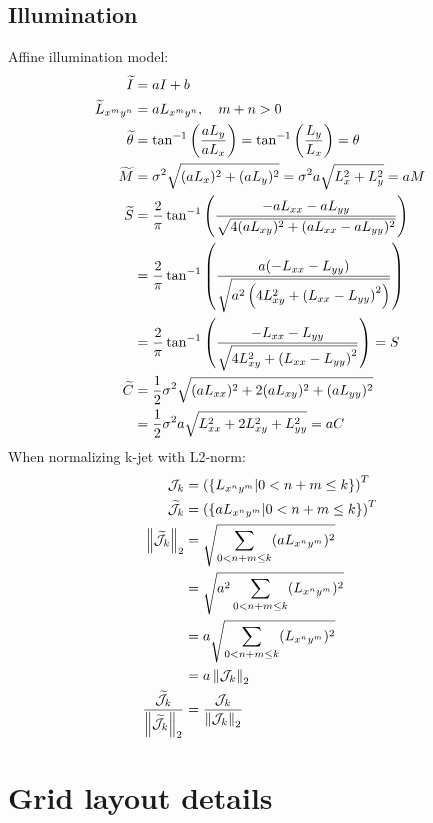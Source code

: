 \documentclass[thesis.tex]{subfiles}
\begin{document}
\section{Illumination} \label{apx:illumination}
%
Affine illumination model:
%
\begin{align}
  \widetilde{I} &= a I  + b \\
  \widetilde{L}_{x^m y^n} &= a L_{x^m y^n}, \quad m+n > 0 \\
  \widetilde{\theta} &= \tan^{-1} \left( \frac{a L_y}{a L_x} \right) = \tan^{-1} \left( \frac{L_y}{L_x} \right) = \theta \\
  \widetilde{M} &= \sigma^2 \sqrt{(a L_x)^2 + (a L_y)^2} = \sigma^2 a \sqrt{L_x^2 + L_y^2} = a M \\
  \widetilde{S} &= \frac{2}{\pi} \tan^{-1} \left( \frac{-a L_{xx} - a L_{yy}}{\sqrt{4(aL_{xy})^2 + (aL_{xx} - aL_{yy})^2}} \right) \\
  &= \frac{2}{\pi} \tan^{-1} \left( \frac{a (-L_{xx} - L_{yy})}{\sqrt{a^2 \left(4L_{xy}^2 + \left(L_{xx} - L_{yy} \right)^2 \right)}} \right) \\
  &= \frac{2}{\pi} \tan^{-1} \left( \frac{-L_{xx} - L_{yy}}{\sqrt{4L_{xy}^2 + \left(L_{xx} - L_{yy} \right)^2}} \right) = S \\
  \widetilde{C} &= \frac12 \sigma^2 \sqrt{(a L_{xx})^2 + 2 (a L_{xy})^2 + (a L_{yy})^2} \\
  &= \frac12 \sigma^2 a \sqrt{L_{xx}^2 + 2 L_{xy}^2 + L_{yy}^2} = a C
\end{align}
%
When normalizing k-jet with L2-norm:
%
\begin{align}
  \mathcal{J}_k &= \left( \left \lbrace L_{x^n y^m} | 0 < n+m \leq k \right \rbrace \right)^T \\
  \widetilde{\mathcal{J}}_k &=\left( \left \lbrace a L_{x^n y^m} | 0 < n+m \leq k \right \rbrace \right)^T \\
  \left \| \widetilde{\mathcal{J}}_k \right \|_2 &= \sqrt{\sum_{0 < n+m \leq k} (a L_{x^n y^m})^2} \\
      &= \sqrt{a^2\sum_{0 < n+m \leq k} (L_{x^n y^m})^2} \\
      &= a\sqrt{\sum_{0 < n+m \leq k} (L_{x^n y^m})^2} \\
      &= a \left \| \mathcal{J}_k \right \|_2 \\
  \frac{\widetilde{\mathcal{J}}_k}{\left \| \widetilde{\mathcal{J}}_k \right \|_2} &=
      \frac{\mathcal{J}_k}{\left \| \mathcal{J}_k \right \|_2}
\end{align}

\chapter{Grid layout details}
\label{apx:grid_layouts}

\end{document}
